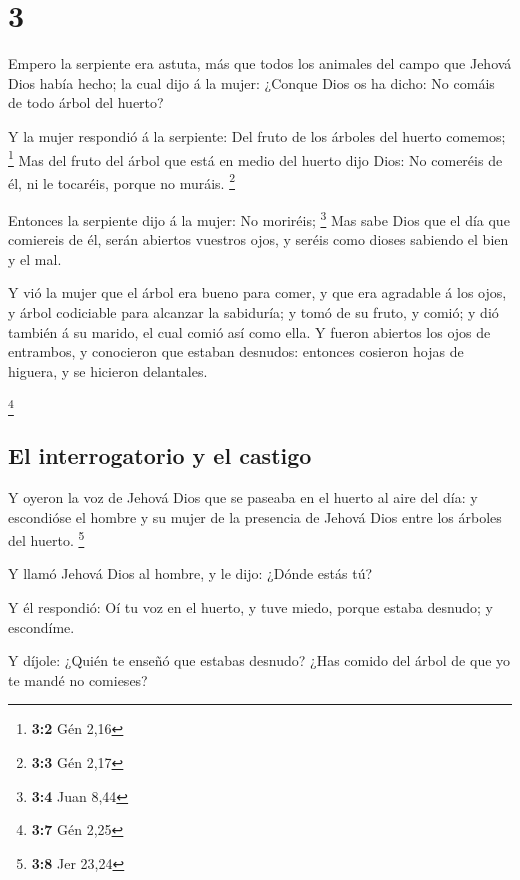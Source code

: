 \hypertarget{section-2}{%
\section{3}\label{section-2}}

 Empero la serpiente era astuta, más que todos los
animales del campo que Jehová Dios había hecho; la cual dijo á la mujer:
¿Conque Dios os ha dicho: No comáis de todo árbol del huerto?

 Y la mujer respondió á la serpiente: Del fruto de los
árboles del huerto comemos; \footnote{\textbf{3:2} Gén 2,16}
 Mas del fruto del árbol que está en medio del huerto dijo
Dios: No comeréis de él, ni le tocaréis, porque no muráis. \footnote{\textbf{3:3}
  Gén 2,17}

 Entonces la serpiente dijo á la mujer: No moriréis;
\footnote{\textbf{3:4} Juan 8,44}  Mas sabe Dios que el
día que comiereis de él, serán abiertos vuestros ojos, y seréis como
dioses sabiendo el bien y el mal.

 Y vió la mujer que el árbol era bueno para comer, y que
era agradable á los ojos, y árbol codiciable para alcanzar la sabiduría;
y tomó de su fruto, y comió; y dió también á su marido, el cual comió
así como ella.  Y fueron abiertos los ojos de entrambos, y
conocieron que estaban desnudos: entonces cosieron hojas de higuera, y
se hicieron delantales.

\footnote{\textbf{3:7} Gén 2,25}

\hypertarget{el-interrogatorio-y-el-castigo}{%
\subsection{El interrogatorio y el
castigo}\label{el-interrogatorio-y-el-castigo}}

 Y oyeron la voz de Jehová Dios que se paseaba en el
huerto al aire del día: y escondióse el hombre y su mujer de la
presencia de Jehová Dios entre los árboles del huerto. \footnote{\textbf{3:8}
  Jer 23,24}

 Y llamó Jehová Dios al hombre, y le dijo: ¿Dónde estás
tú?

 Y él respondió: Oí tu voz en el huerto, y tuve miedo,
porque estaba desnudo; y escondíme.

 Y díjole: ¿Quién te enseñó que estabas desnudo? ¿Has
comido del árbol de que yo te mandé no comieses?

